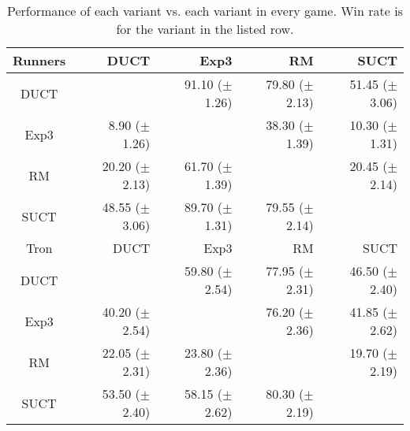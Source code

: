 \documentclass{article}
\begin{document}
\begin{table}
\begin{center}
\begin{tabular}{|c|rrrr|}
\hline
\hline
        Runners   &       DUCT   &       Exp3   &         RM   &       SUCT   \\
\hline
           DUCT    &              & 91.10 ($\pm$ 1.26)   & 79.80 ($\pm$ 2.13)   & 51.45 ($\pm$ 3.06)   \\
           Exp3    & 8.90 ($\pm$ 1.26)   &              & 38.30 ($\pm$ 1.39)   & 10.30 ($\pm$ 1.31)   \\
             RM    & 20.20 ($\pm$ 2.13)   & 61.70 ($\pm$ 1.39)   &              & 20.45 ($\pm$ 2.14)   \\
           SUCT    & 48.55 ($\pm$ 3.06)   & 89.70 ($\pm$ 1.31)   & 79.55 ($\pm$ 2.14)   &              \\
\hline
\hline
           Tron   &       DUCT   &       Exp3   &         RM   &       SUCT   \\
\hline
           DUCT    &              & 59.80 ($\pm$ 2.54)   & 77.95 ($\pm$ 2.31)   & 46.50 ($\pm$ 2.40)   \\
           Exp3    & 40.20 ($\pm$ 2.54)   &              & 76.20 ($\pm$ 2.36)   & 41.85 ($\pm$ 2.62)   \\
             RM    & 22.05 ($\pm$ 2.31)   & 23.80 ($\pm$ 2.36)   &              & 19.70 ($\pm$ 2.19)   \\
           SUCT    & 53.50 ($\pm$ 2.40)   & 58.15 ($\pm$ 2.62)   & 80.30 ($\pm$ 2.19)   &              \\
\hline

\end{tabular}
\end{center}
\caption{Performance of each variant vs. each variant in every game. Win rate is for the variant in the listed row. \label{tbl:cross}}
\end{table}
\end{document}

